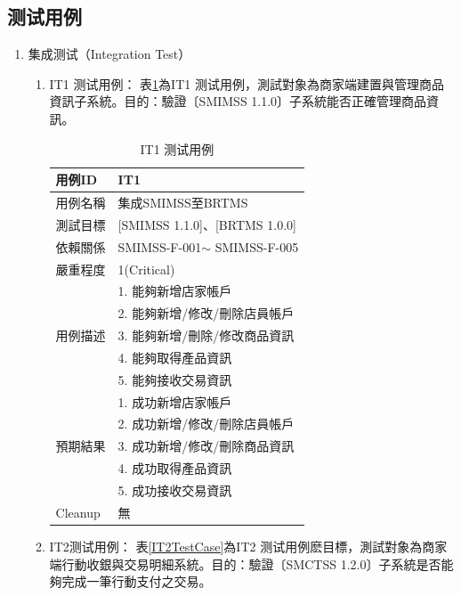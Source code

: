 		\subsection{测试用例}
			\begin{enumerate}

			\item 集成测试（Integration Test）
				\begin{enumerate}

				\item IT1 测试用例：
					表\ref{IT1TestCase}為IT1 测试用例，測試對象為商家端建置與管理商品資訊子系統。目的：驗證〔SMIMSS 1.1.0〕子系統能否正確管理商品資訊。

					\begin{table}[htbp]
					\centering
					\caption{IT1 测试用例}
					\label{IT1TestCase}
					\begin{tabular}{|l|l|}
					\hline
					用例ID & IT1 \\ \hline
					用例名稱 & 集成SMIMSS至BRTMS \\ \hline
					測試目標 & {[}SMIMSS 1.1.0{]}、{[}BRTMS 1.0.0{]} \\ \hline
					依賴關係 & SMIMSS-F-001$\sim$ SMIMSS-F-005 \\ \hline
					嚴重程度 & 1(Critical) \\ \hline
					\multirow{5}{*}{用例描述} & 1.     能夠新增店家帳戶 \\ \cline{2-2} 
					 & 2.     能夠新增/修改/刪除店員帳戶 \\ \cline{2-2} 
					 & 3.     能夠新增/刪除/修改商品資訊 \\ \cline{2-2} 
					 & 4.     能夠取得產品資訊 \\ \cline{2-2} 
					 & 5.     能夠接收交易資訊 \\ \hline
					\multirow{5}{*}{預期結果} & 1.     成功新增店家帳戶 \\ \cline{2-2} 
					 & 2.     成功新增/修改/刪除店員帳戶 \\ \cline{2-2} 
					 & 3.     成功新增/修改/刪除商品資訊 \\ \cline{2-2} 
					 & 4.     成功取得產品資訊 \\ \cline{2-2} 
					 & 5.     成功接收交易資訊 \\ \hline
					Cleanup & 無 \\ \hline
					\end{tabular}
					\end{table}


				\item IT2测试用例：
					表\ref{IT2TestCase}為IT2 测试用例麽目標，測試對象為商家端行動收銀與交易明細系統。目的：驗證〔SMCTSS 1.2.0〕子系統是否能夠完成一筆行動支付之交易。


\end{enumerate}
\end{enumerate}
